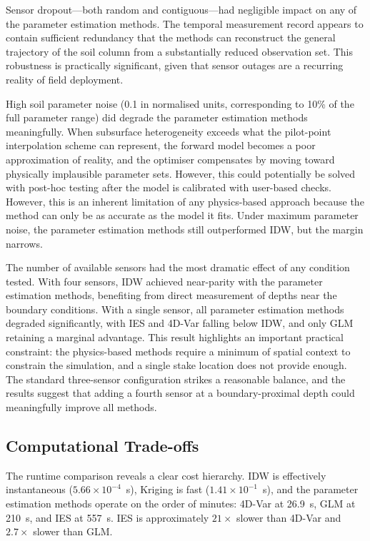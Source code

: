 Sensor dropout---both random and contiguous---had negligible impact on any of the parameter estimation methods. The temporal measurement record appears to contain sufficient redundancy that the methods can reconstruct the general trajectory of the soil column from a substantially reduced observation set. This robustness is practically significant, given that sensor outages are a recurring reality of field deployment.

High soil parameter noise (0.1 in normalised units, corresponding to 10\% of the full parameter range) did degrade the parameter estimation methods meaningfully. When subsurface heterogeneity exceeds what the pilot-point interpolation scheme can represent, the forward model becomes a poor approximation of reality, and the optimiser compensates by moving toward physically implausible parameter sets. However, this could potentially be solved with post-hoc testing after the model is calibrated with user-based checks. However, this is an inherent limitation of any physics-based approach because the method can only be as accurate as the model it fits. Under maximum parameter noise, the parameter estimation methods still outperformed IDW, but the margin narrows.

The number of available sensors had the most dramatic effect of any condition tested. With four sensors, IDW achieved near-parity with the parameter estimation methods, benefiting from direct measurement of depths near the boundary conditions. With a single sensor, all parameter estimation methods degraded significantly, with IES and 4D-Var falling below IDW, and only GLM retaining a marginal advantage. This result highlights an important practical constraint: the physics-based methods require a minimum of spatial context to constrain the simulation, and a single stake location does not provide enough. The standard three-sensor configuration strikes a reasonable balance, and the results suggest that adding a fourth sensor at a boundary-proximal depth could meaningfully improve all methods.

\subsection{Computational Trade-offs}

The runtime comparison reveals a clear cost hierarchy. IDW is effectively instantaneous ($5.66 \times 10^{-4}$~s), Kriging is fast ($1.41 \times 10^{-1}$~s), and the parameter estimation methods operate on the order of minutes: 4D-Var at 26.9~s, GLM at 210~s, and IES at 557~s. IES is approximately $21\times$ slower than 4D-Var and $2.7\times$ slower than GLM.

